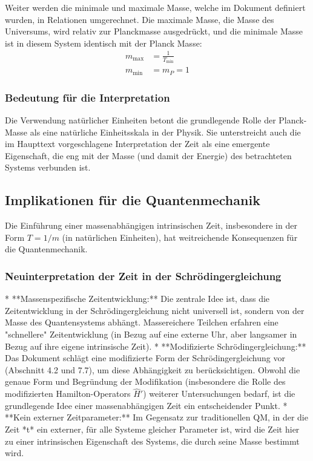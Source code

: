 Weiter werden die minimale und maximale Masse, welche im Dokument definiert wurden, in Relationen umgerechnet. Die maximale Masse, die Masse des Universums, wird relativ zur Planckmasse ausgedrückt, und die minimale Masse ist in diesem System identisch mit der Planck Masse:
\begin{align}
	m_{\text{max}} &= \frac{1}{T_{\text{min}}}\\
	m_{\text{min}} &= m_P = 1
\end{align}

\subsubsection{Bedeutung für die Interpretation}

Die Verwendung natürlicher Einheiten betont die grundlegende Rolle der Planck-Masse als eine natürliche Einheitsskala in der Physik. Sie unterstreicht auch die im Haupttext vorgeschlagene Interpretation der Zeit als eine emergente Eigenschaft, die eng mit der Masse (und damit der Energie) des betrachteten Systems verbunden ist.

\subsection{Implikationen für die Quantenmechanik}

Die Einführung einer massenabhängigen intrinsischen Zeit, insbesondere in der Form $T = 1/m$ (in natürlichen Einheiten), hat weitreichende Konsequenzen für die Quantenmechanik.

\subsubsection{Neuinterpretation der Zeit in der Schrödingergleichung}

*   **Massenspezifische Zeitentwicklung:** Die zentrale Idee ist, dass die Zeitentwicklung in der Schrödingergleichung nicht universell ist, sondern von der Masse des Quantensystems abhängt.  Massereichere Teilchen erfahren eine "schnellere" Zeitentwicklung (in Bezug auf eine externe Uhr, aber langsamer in Bezug auf ihre eigene intrinsische Zeit).
*   **Modifizierte Schrödingergleichung:** Das Dokument schlägt eine modifizierte Form der Schrödingergleichung vor (Abschnitt 4.2 und 7.7), um diese Abhängigkeit zu berücksichtigen. Obwohl die genaue Form und Begründung der Modifikation (insbesondere die Rolle des modifizierten Hamilton-Operators $\hat{H}'$) weiterer Untersuchungen bedarf, ist die grundlegende Idee einer massenabhängigen Zeit ein entscheidender Punkt.
* **Kein externer Zeitparameter:** Im Gegensatz zur traditionellen QM, in der die Zeit *t* ein externer, für alle Systeme gleicher Parameter ist, wird die Zeit hier zu einer intrinsischen Eigenschaft des Systems, die durch seine Masse bestimmt wird.

